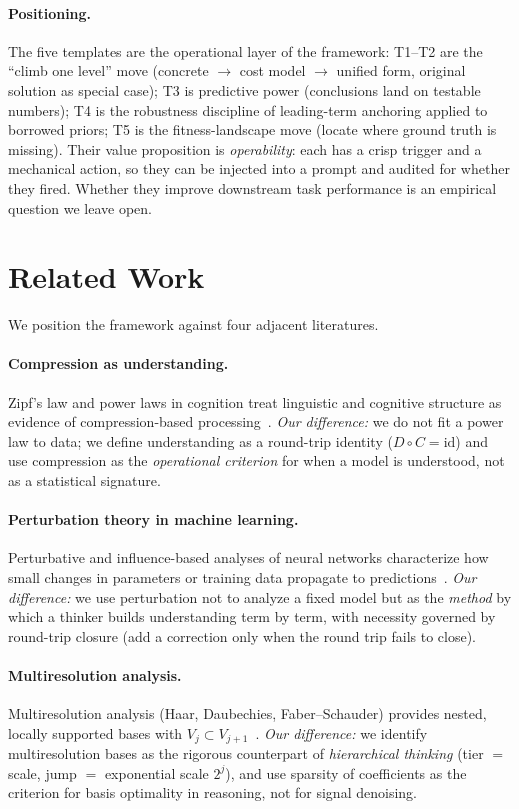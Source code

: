 \documentclass[11pt]{article}
\newcommand{\Cmap}{C}
\newcommand{\Dmap}{D}
\begin{document}
\paragraph{Positioning.}
The five templates are the operational layer of the framework: T1--T2 are the
``climb one level'' move (concrete $\to$ cost model $\to$ unified form, original
solution as special case); T3 is predictive power (conclusions land on testable
numbers); T4 is the robustness discipline of leading-term anchoring applied to
borrowed priors; T5 is the fitness-landscape move (locate where ground truth is
missing). Their value proposition is \emph{operability}: each has a crisp
trigger and a mechanical action, so they can be injected into a prompt and
audited for whether they fired. Whether they improve downstream task performance
is an empirical question we leave open.
\section{Related Work}
\label{sec:related}

We position the framework against four adjacent literatures.

\paragraph{Compression as understanding.}
Zipf's law and power laws in cognition treat linguistic and cognitive structure
as evidence of compression-based processing~\cite{newman_powerlaws_2005}. \emph{Our
difference:} we do not fit a power law to data; we define understanding as a
round-trip identity ($\Dmap\circ\Cmap=\mathrm{id}$) and use compression as the
\emph{operational criterion} for when a model is understood, not as a statistical
signature.

\paragraph{Perturbation theory in machine learning.}
Perturbative and influence-based analyses of neural networks characterize how
small changes in parameters or training data propagate to predictions~\cite{kaspschak_nnpt_2020,koh_liang_influence_2017}. \emph{Our difference:}
we use perturbation not to analyze a fixed model but as the \emph{method} by
which a thinker builds understanding term by term, with necessity governed by
round-trip closure (add a correction only when the round trip fails to close).

\paragraph{Multiresolution analysis.}
Multiresolution analysis (Haar, Daubechies, Faber--Schauder) provides nested,
locally supported bases with $V_j\subset V_{j+1}$~\cite{daubechies_1988}.
\emph{Our difference:} we identify multiresolution bases as the rigorous
counterpart of \emph{hierarchical thinking} (tier $=$ scale, jump $=$
exponential scale $2^j$), and use sparsity of coefficients as the criterion for
basis optimality in reasoning, not for signal denoising.
\end{document}
